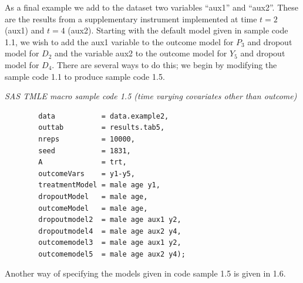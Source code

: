 \documentclass[10pt]{article}
\renewcommand{\baselinestretch}{1.3}
\begin{document}
As a final example we add to the dataset two variables ``aux1'' and ``aux2''.  These are the results from a supplementary instrument implemented at time $t=2$ (aux1) and $t=4$ (aux2).  Starting with the default model given in sample code 1.1, we wish to add the aux1 variable to the outcome model for $P_3$ and dropout model for $D_2$ and the variable aux2 to the outcome model for $Y_5$ and dropout model for $D_4$.  There are several ways to do this; we begin by modifying the sample code 1.1 to produce sample code 1.5.
\newpage
\begin{minipage}{\textwidth}
\renewcommand{\baselinestretch}{1.0}\selectfont%
\begin{minipage}[l]{5.6in}
\normalsize\em%
SAS TMLE macro sample code 1.5 (time varying covariates other than outcome)
\end{minipage}\vspace{-0.08in}
\begin{Verbatim}[baselinestretch=1.0, fontsize=\small, frame=single, commandchars=\\\{\}]
 %tmle( 
        data           = data.example2,
        outtab         = results.tab5,
        nreps          = 10000, 
        seed           = 1831,
        A              = trt,
        outcomeVars    = y1-y5,
        treatmentModel = male age y1,
        dropoutModel   = male age,
        outcomeModel   = male age,
        dropoutmodel2  = male age aux1 y2,
        dropoutmodel4  = male age aux2 y4,
        outcomemodel3  = male age aux1 y2,
        outcomemodel5  = male age aux2 y4);
\end{Verbatim}
\end{minipage}
\vspace{0.2in}



Another way of specifying the models given in code sample 1.5 is given in 1.6.
\vspace{0.1in}
\end{document}
